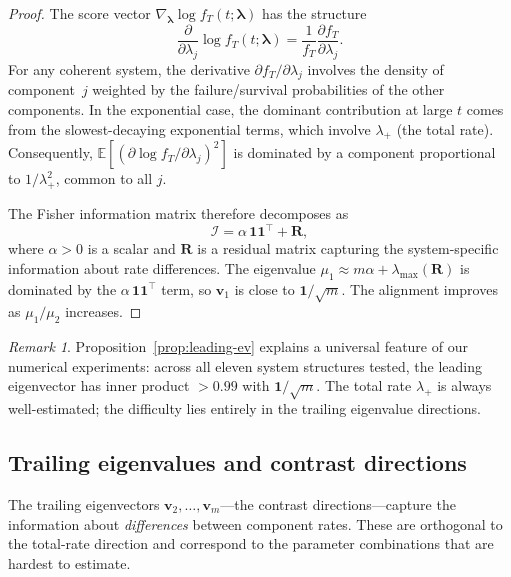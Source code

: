 \documentclass[12pt]{article}
\theoremstyle{definition}
\theoremstyle{remark}
\newtheorem{remark}[theorem]{Remark}
\newcommand{\E}{\mathbb{E}}
\newcommand{\bone}{\mathbf{1}}
\newcommand{\blam}{\boldsymbol{\lambda}}
\begin{document}
\begin{proof}
The score vector $\nabla_{\blam} \log f_T(t; \blam)$ has the
structure
\[
  \frac{\partial}{\partial \lambda_j} \log f_T(t; \blam)
  = \frac{1}{f_T} \frac{\partial f_T}{\partial \lambda_j}.
\]
For any coherent system, the derivative $\partial f_T / \partial \lambda_j$
involves the density of component~$j$ weighted by the failure/survival
probabilities of the other components.  In the exponential case, the
dominant contribution at large $t$ comes from the slowest-decaying
exponential terms, which involve $\lambda_+$ (the total rate).
Consequently, $\E[(\partial \log f_T / \partial \lambda_j)^2]$ is
dominated by a component proportional to $1/\lambda_+^2$, common to
all $j$.

The Fisher information matrix therefore decomposes as
\[
  \mathcal{I} = \alpha\, \bone\bone^\top + \mathbf{R},
\]
where $\alpha > 0$ is a scalar and $\mathbf{R}$ is a residual matrix
capturing the system-specific information about rate differences.
The eigenvalue $\mu_1 \approx m\alpha + \lambda_{\max}(\mathbf{R})$
is dominated by the $\alpha\, \bone\bone^\top$ term, so $\mathbf{v}_1$
is close to $\bone/\sqrt{m}$.  The alignment improves as $\mu_1 / \mu_2$
increases.
\end{proof}

\begin{remark}
Proposition~\ref{prop:leading-ev} explains a universal feature of
our numerical experiments: across all eleven system structures tested,
the leading eigenvector has inner product $> 0.99$ with
$\bone / \sqrt{m}$.  The total rate $\lambda_+$ is always
well-estimated; the difficulty lies entirely in the trailing
eigenvalue directions.
\end{remark}

\subsection{Trailing eigenvalues and contrast directions}
\label{sec:trailing-ev}

The trailing eigenvectors $\mathbf{v}_2, \ldots, \mathbf{v}_m$---the
contrast directions---capture the information about \emph{differences}
between component rates.  These are orthogonal to the total-rate
direction and correspond to the parameter combinations that are
hardest to estimate.
\end{document}

